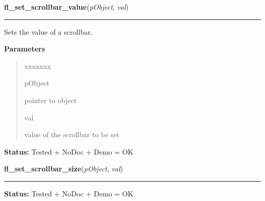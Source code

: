 \hspace{.8\funcindent}\begin{boxedminipage}{\funcwidth}

    \raggedright \textbf{fl\_set\_scrollbar\_value}(\textit{pObject}, \textit{val})

    \vspace{-1.5ex}

    \rule{\textwidth}{0.5\fboxrule}
\setlength{\parskip}{2ex}
    Sets the value of a scrollbar.

\setlength{\parskip}{1ex}
      \textbf{Parameters}
      \vspace{-1ex}

      \begin{quote}
        \begin{Ventry}{xxxxxxx}

          \item[pObject]

          pointer to object

          \item[val]

          value of the scrollbar to be set

        \end{Ventry}

      \end{quote}

\textbf{Status:} Tested + NoDoc + Demo = OK



    \end{boxedminipage}

    \label{xformslib:library:fl_set_scrollbar_size}

    \vspace{0.5ex}

\hspace{.8\funcindent}\begin{boxedminipage}{\funcwidth}

    \raggedright \textbf{fl\_set\_scrollbar\_size}(\textit{pObject}, \textit{val})

    \vspace{-1.5ex}

    \rule{\textwidth}{0.5\fboxrule}
\setlength{\parskip}{2ex}
\setlength{\parskip}{1ex}
\textbf{Status:} Tested + NoDoc + Demo = OK



    \end{boxedminipage}

